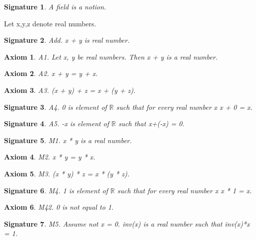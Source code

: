 \documentclass{article}
\newenvironment{forthel}{\begin{leftbar}}{\end{leftbar}}
\newtheorem{axiom}{Axiom}
\newtheorem{signature}{Signature}
\begin{document}
\begin{forthel}

\begin{signature} A field is a notion.

\end{signature}

Let x,y,z denote real numbers.

\begin{signature} Add. x + y is real number.

\end{signature}
\begin{axiom} A1. Let x, y be real numbers. Then x + y is a real number.

\end{axiom}
\begin{axiom} A2. x + y = y + x.

\end{axiom}
\begin{axiom} A3. (x + y) + z = x + (y + z). 

\end{axiom}
\begin{signature} A4. 0 is element of $\mathbb{R}$ such that for every real number x x + 0 = x.

\end{signature}
\begin{signature} A5. -x is element of $\mathbb{R}$ such that x+(-x) = 0.

\end{signature}

\begin{signature} M1. x * y is a real number.

\end{signature}
\begin{axiom} M2. x * y = y * x.

\end{axiom}
\begin{axiom} M3. (x * y) * z = x * (y * z).

\end{axiom}
\begin{signature} M4. 1 is element of $\mathbb{R}$ such that for every real number x x * 1 = x.

\end{signature}
\begin{axiom} M42. 0 is not equal to 1.

\end{axiom}
\begin{signature} M5. Assume not x = 0. inv(x) is a real number such that inv(x)*x = 1.


\end{signature}
\end{forthel}
\end{document}
